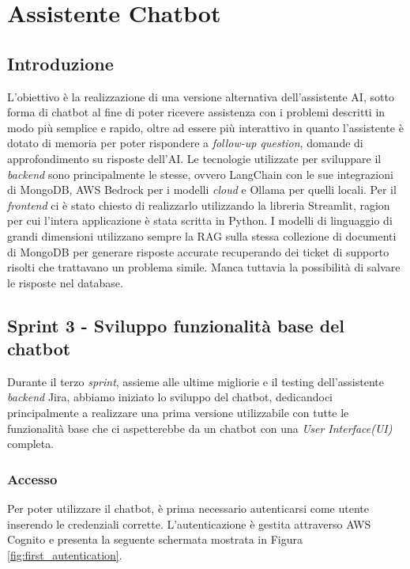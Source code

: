 \newpage
\section{Assistente Chatbot}

\subsection{Introduzione}
L'obiettivo è la realizzazione di una versione alternativa dell'assistente AI, sotto forma di chatbot al fine di poter ricevere assistenza con i problemi descritti in modo più semplice e rapido, oltre ad essere più interattivo in quanto l'assistente è dotato di memoria per poter rispondere a \textit{follow-up question}, domande di approfondimento su risposte dell'AI.
Le tecnologie utilizzate per sviluppare il \textit{backend} sono principalmente le stesse, ovvero LangChain con le sue integrazioni di MongoDB, AWS Bedrock per i modelli \textit{cloud} e Ollama per quelli locali.
Per il \textit{frontend} ci è stato chiesto di realizzarlo utilizzando la libreria Streamlit, ragion per cui l'intera applicazione è stata scritta in Python.
I modelli di linguaggio di grandi dimensioni utilizzano sempre la RAG sulla stessa collezione di documenti di MongoDB per generare risposte accurate recuperando dei ticket di supporto risolti che trattavano un problema simile.
Manca tuttavia la possibilità di salvare le risposte nel database.

\subsection{Sprint 3 - Sviluppo funzionalità base del chatbot}
Durante il terzo \textit{sprint}, assieme alle ultime migliorie e il testing dell'assistente \textit{backend} Jira, abbiamo iniziato lo sviluppo del chatbot, dedicandoci principalmente a realizzare una prima versione utilizzabile con tutte le funzionalità base che ci aspetterebbe da un chatbot con una \textit{User Interface(UI)} completa.

\subsubsection*{Accesso}
Per poter utilizzare il chatbot, è prima necessario autenticarsi come utente inserendo le credenziali corrette. L'autenticazione è gestita attraverso AWS Cognito e presenta la seguente schermata mostrata in Figura \ref{fig:first_autentication}.


